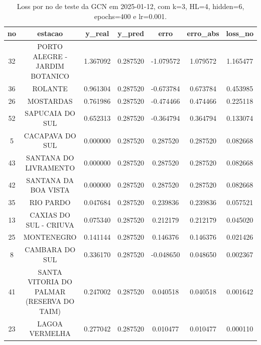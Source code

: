 \begin{table}[h]
\centering
\caption{Loss por no de teste da GCN em 2025-01-12, com k=3, HL=4, hidden=6, epochs=400 e lr=0.001.}
\label{tab:gcn_loss_k3_hl4_h6_e400_d20250112}
\begin{tabular}{ccccccc}
\toprule
no & estacao & y\_real & y\_pred & erro & erro\_abs & loss\_no \\
\midrule
32 & PORTO ALEGRE - JARDIM BOTANICO & 1.367092 & 0.287520 & -1.079572 & 1.079572 & 1.165477 \\
36 & ROLANTE & 0.961304 & 0.287520 & -0.673784 & 0.673784 & 0.453985 \\
26 & MOSTARDAS & 0.761986 & 0.287520 & -0.474466 & 0.474466 & 0.225118 \\
52 & SAPUCAIA DO SUL & 0.652313 & 0.287520 & -0.364794 & 0.364794 & 0.133074 \\
5 & CACAPAVA DO SUL & 0.000000 & 0.287520 & 0.287520 & 0.287520 & 0.082668 \\
43 & SANTANA DO LIVRAMENTO & 0.000000 & 0.287520 & 0.287520 & 0.287520 & 0.082668 \\
42 & SANTANA DA BOA VISTA & 0.000000 & 0.287520 & 0.287520 & 0.287520 & 0.082668 \\
35 & RIO PARDO & 0.047684 & 0.287520 & 0.239836 & 0.239836 & 0.057521 \\
13 & CAXIAS DO SUL - CRIUVA & 0.075340 & 0.287520 & 0.212179 & 0.212179 & 0.045020 \\
25 & MONTENEGRO & 0.141144 & 0.287520 & 0.146376 & 0.146376 & 0.021426 \\
8 & CAMBARA DO SUL & 0.336170 & 0.287520 & -0.048650 & 0.048650 & 0.002367 \\
41 & SANTA VITORIA DO PALMAR (RESERVA DO TAIM) & 0.247002 & 0.287520 & 0.040518 & 0.040518 & 0.001642 \\
23 & LAGOA VERMELHA & 0.277042 & 0.287520 & 0.010477 & 0.010477 & 0.000110 \\
\bottomrule
\end{tabular}
\end{table}
